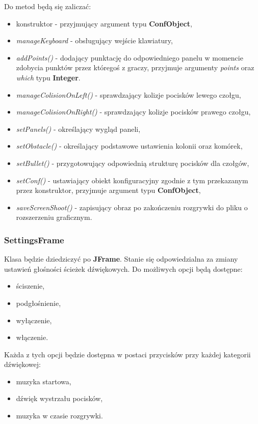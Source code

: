 \documentclass[a4paper]{article}
\begin{document}
Do metod b\k{e}d\k{a} si\k{e} zalicza\'c:

\begin{itemize}
    \item konstruktor - przyjmuj\k{a}cy argument typu \textbf{ConfObject},
    \item \textit{manageKeyboard} - obs\l{}uguj\k{a}cy wej\'scie klawiatury,
    \item \textit{addPoints()} - dodaj\k{a}cy punktacj\k{e} do odpowiedniego panelu w momencie zdobycia punkt\'ow przez kt\'orego\'s z graczy, przyjmuje argumenty \textit{points} oraz \textit{which} typu \textbf{Integer}. 
    \item \textit{manageColisionOnLeft()} - sprawdzaj\k{a}cy kolizje pocisk\'ow lewego czo\l{}gu,
    \item \textit{manageColisionOnRight()} - sprawdzaj\k{a}cy kolizje pocisk\'ow prawego czo\l{}gu,
    \item \textit{setPanels()} - okre\'slaj\k{a}cy wygl\k{a}d paneli,
    \item \textit{setObstacle()} - okre\'slaj\k{a}cy podstawowe ustawienia kolonii oraz kom\'orek,
    \item \textit{setBullet()} - przygotowuj\k{a}cy odpowiedni\k{a} struktur\k{e} pocisk\'ow dla czo\l{}g\'ow,
    \item \textit{setConf()} - ustawiaj\k{a}cy obiekt konfiguracyjny zgodnie z tym przekazanym przez konstruktor, przyjmuje argument typu \textbf{ConfObject},
    \item \textit{saveScreenShoot()} - zapisuj\k{a}cy obraz po zako\'nczeniu rozgrywki do pliku o rozszerzeniu graficznym.
\end{itemize}

\subsubsection{SettingsFrame}

\quad Klasa b\k{e}dzie dziedziczy\'c po \textbf{JFrame}. Stanie si\k{e} odpowiedzialna za zmiany ustawie\'n g\l{}o\'sno\'sci \'scie\.zek d\'zwi\k{e}kowych. Do mo\.zliwych opcji b\k{e}d\k{a} dost\k{e}pne: 
\begin{itemize}
    \item \'sciszenie,
    \item  podg\l{}o\'snienie,
    \item wy\l{}\k{a}czenie,
    \item w\l{}\k{a}czenie.
\end{itemize}
Ka\.zda z tych opcji b\k{e}dzie dost\k{e}pna w postaci przycisk\'ow przy ka\.zdej kategorii d\'zwi\k{e}kowej:
\begin{itemize}
    \item muzyka startowa,
    \item d\'zwi\k{e}k wystrza\l{}u pocisk\'ow,
    \item muzyka w czasie rozgrywki.
\end{itemize}
\end{document}
